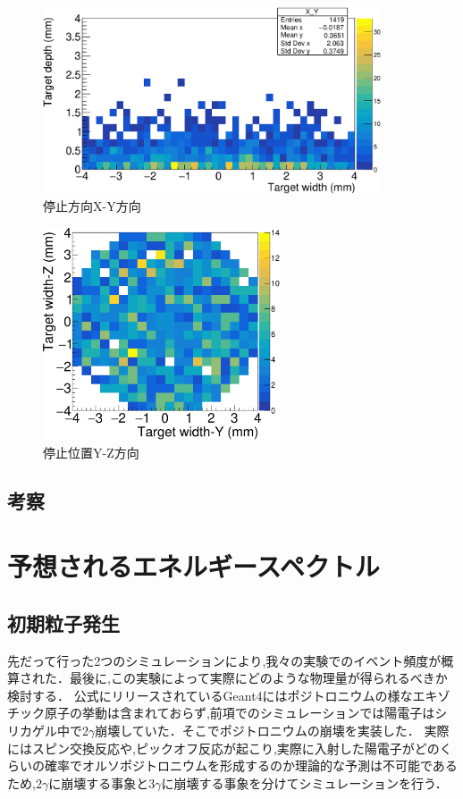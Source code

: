 \begin{figure}[htbp]
	\centering
		\includegraphics[width=10cm]{fig/test2bXY.pdf}
	\caption{停止方向X-Y方向}
	\label{test2bXY}
\end{figure}

\begin{figure}[htbp]
	\centering
		\includegraphics[width=7cm]{fig/test2bYZ.pdf}
	\caption{停止位置Y-Z方向}
	\label{test2bYZ}
\end{figure}

\subsection{考察}


\section{予想されるエネルギースペクトル}

\subsection{初期粒子発生}
先だって行った2つのシミュレーションにより,我々の実験でのイベント頻度が概算された．最後に,この実験によって実際にどのような物理量が得られるべきか検討する．
公式にリリースされているGeant4にはポジトロニウムの様なエキゾチック原子の挙動は含まれておらず,前項でのシミュレーションでは陽電子はシリカゲル中で2$\gamma$崩壊していた．そこでポジトロニウムの崩壊を実装した．
実際にはスピン交換反応や,ピックオフ反応が起こり,実際に入射した陽電子がどのくらいの確率でオルソポジトロニウムを形成するのか理論的な予測は不可能であるため,$2\gamma$に崩壊する事象と$3\gamma$に崩壊する事象を分けてシミュレーションを行う．

